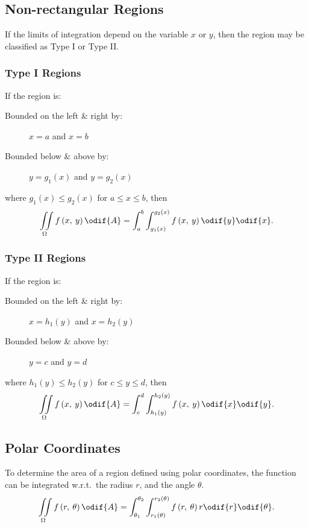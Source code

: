 \documentclass{article}
\begin{document}
\subsection{Non-rectangular Regions}
If the limits of integration depend on the variable \(x\) or \(y\),
then the region may be classified as Type I or Type II\@.
\subsubsection{Type I Regions}
If the region is:
\begin{description}
    \item[Bounded on the left \& right by:] \(x=a\) and \(x=b\)
    \item[Bounded below \& above by:] \(y=g_1\left( x \right)\) and
          \(y=g_2\left( x \right)\)
\end{description}
where \(g_1\left( x \right) \leq g_2\left( x \right)\) for \(a \leq x \leq b\), then
\begin{equation*}
    \iint\limits_{\Omega} f\left( x,\: y \right) \odif{A} = \int_a^b\int_{g_1\left( x \right)}^{g_2\left( x \right)} f\left( x,\: y \right) \odif{y} \odif{x}.
\end{equation*}
\subsubsection{Type II Regions}
If the region is:
\begin{description}
    \item[Bounded on the left \& right by:] \(x=h_1\left( y \right)\)
          and \(x=h_2\left( y \right)\)
    \item[Bounded below \& above by:] \(y=c\) and \(y=d\)
\end{description}
where \(h_1\left( y \right) \leq h_2\left( y \right)\) for \(c \leq y \leq d\), then
\begin{equation*}
    \iint\limits_{\Omega} f\left( x,\: y \right) \odif{A} = \int_c^d\int_{h_1\left( y \right)}^{h_2\left( y \right)} f\left( x,\: y \right) \odif{x} \odif{y}.
\end{equation*}
\subsection{Polar Coordinates}
To determine the area of a region defined using polar coordinates, the
function can be integrated w.r.t.\ the radius \(r\), and the angle
\(\theta\).
\begin{equation*}
    \iint\limits_{\Omega} f\left( r,\: \theta \right) \odif{A} = \int_{\theta_1}^{\theta_2}\int_{r_1\left( \theta \right)}^{r_2\left( \theta \right)} f\left(r,\: \theta\right) r \odif{r} \odif{\theta}.
\end{equation*}
\end{document}
